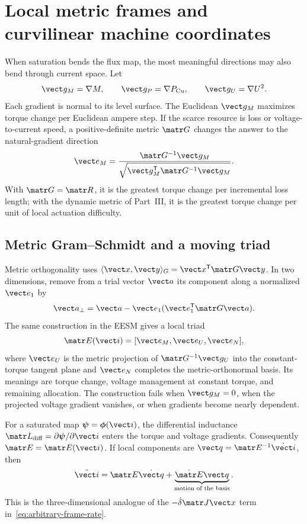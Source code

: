 \section{Local metric frames and curvilinear machine coordinates}
\label{sec:moving-task-frames}

When saturation bends the flux map, the most meaningful directions may also
bend through current space. Let
\[
 \vect g_M=\nabla M,\qquad \vect g_P=\nabla P_{\mathrm{Cu}},\qquad
 \vect g_U=\nabla U^2.
\]
Each gradient is normal to its level surface. The Euclidean \(\vect g_M\)
maximizes torque change per Euclidean ampere step. If the scarce resource is
loss or voltage-to-current speed, a positive-definite metric \(\matr G\)
changes the answer to the natural-gradient direction
\begin{equation}
 \vect e_M=
 \frac{\matr G^{-1}\vect g_M}
 {\sqrt{\vect g_M^{\mathsf T}\matr G^{-1}\vect g_M}}.
 \label{eq:metric-torque-axis}
\end{equation}
With \(\matr G=\matr R\), it is the greatest torque change per incremental
loss length; with the dynamic metric of Part~III, it is the greatest torque
change per unit of local actuation difficulty.



\subsection{Metric Gram--Schmidt and a moving triad}

Metric orthogonality uses
\(\langle\vect x,\vect y\rangle_G=\vect x^{\mathsf T}\matr G\vect y\).
In two dimensions, remove from a trial vector \(\vect a\) its component along
a normalized \(\vect e_1\) by
\[
 \vect a_\perp=\vect a-\vect e_1(\vect e_1^{\mathsf T}\matr G\vect a).
\]
The same construction in the EESM gives a local triad
\[
 \matr E(\vect i)=[\vect e_M,\vect e_U,\vect e_N],
\]
where \(\vect e_U\) is the metric projection of
\(\matr G^{-1}\vect g_U\) into the constant-torque tangent plane and
\(\vect e_N\) completes the metric-orthonormal basis. Its meanings are
torque change, voltage management at constant torque, and remaining
allocation. The construction fails when \(\vect g_M=0\), when the projected
voltage gradient vanishes, or when gradients become nearly dependent.

For a saturated map
\(\boldsymbol\psi=\boldsymbol\phi(\vect i)\), the differential inductance
\(\matr L_{\mathrm{diff}}=\partial\boldsymbol\psi/\partial\vect i\) enters
the torque and voltage gradients. Consequently \(\matr E=\matr E(\vect i)\).
If local components are \(\vect q=\matr E^{-1}\dot{\vect i}\), then
\[
 \ddot{\vect i}=\matr E\dot{\vect q}
 +\underbrace{\dot{\matr E}\vect q}_{\text{motion of the basis}}.
\]
This is the three-dimensional analogue of the
\(-\dot\delta\matr J\vect x\) term in~\eqref{eq:arbitrary-frame-rate}.

